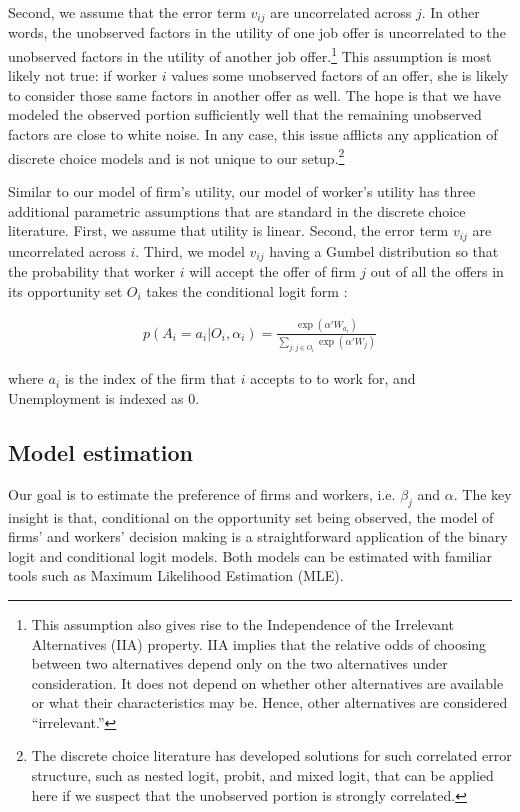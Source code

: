 Second, we assume that the error term $v_{ij}$ are uncorrelated across $j$. In
other words, the unobserved factors in the utility of one job offer is
uncorrelated to the unobserved factors in the utility of another job
offer.\footnote{This assumption also gives rise to the Independence of the
  Irrelevant Alternatives (IIA) property. IIA implies that the relative odds of
  choosing between two alternatives depend only on the two alternatives under
  consideration. It does not depend on whether other alternatives are available
  or what their characteristics may be. Hence, other alternatives are considered
  ``irrelevant.''} This assumption is most likely not true: if worker $i$ values
some unobserved factors of an offer, she is likely to consider those same
factors in another offer as well. The hope is that we have modeled the observed
portion sufficiently well that the remaining unobserved factors are close to
white noise. In any case, this issue afflicts any application of discrete choice
models and is not unique to our setup.\footnote{The discrete choice literature
  has developed solutions for such correlated error structure, such as nested
  logit, probit, and mixed logit, that can be applied here if we suspect that
  the unobserved portion is strongly correlated.}

Similar to our model of firm's utility, our model of worker's utility has three
additional parametric assumptions that are standard in the discrete choice
literature. First, we assume that utility is linear. Second, the error term
$v_{ij}$ are uncorrelated across $i$. Third, we model $v_{ij}$ having a Gumbel
distribution so that the probability that worker $i$ will accept the offer of
firm $j$ out of all the offers in its opportunity set $O_i$ takes the
conditional logit form \citep{Cameron2005}:

\begin{align}
  p(A_i = a_i | O_i, \alpha_i) = \frac{\exp(\alpha'W_{a_i})}{\sum\limits_{j:j \in O_i} \exp(\alpha'W_j)} \label{eq:conditional_probability_of_accept}
\end{align}

where $a_i$ is the index of the firm that $i$ accepts to to work for, and
Unemployment is indexed as 0.

\subsection{Model estimation}

Our goal is to estimate the preference of firms and workers, i.e. $\beta_j$ and
$\alpha$. The key insight is that, conditional on the opportunity set being
observed, the model of firms' and workers' decision making is a straightforward
application of the binary logit and conditional logit models. Both models can be
estimated with familiar tools such as Maximum Likelihood Estimation (MLE).

